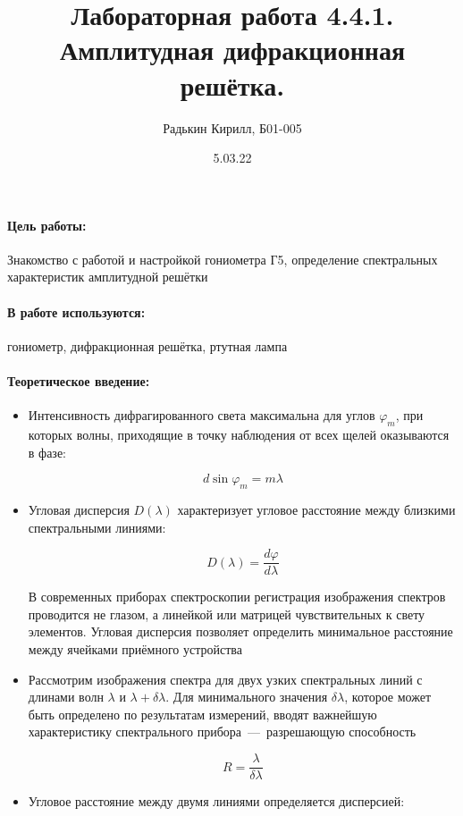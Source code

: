 \documentclass[a4paper, 12pt]{article}
\author{Радькин Кирилл, Б01-005}
\date{5.03.22}
\title{Лабораторная работа 4.4.1. Амплитудная дифракционная решётка.}
\renewcommand{\phi}{\varphi}
\newcommand{\parag}[1]{\paragraph*{#1:}}
\begin{document}
\maketitle

\parag {Цель работы} Знакомство с работой и настройкой гониометра Г5, определение спектральных характеристик амплитудной решётки

\parag {В работе используются} гониометр, дифракционная решётка, ртутная лампа

\parag {Теоретическое введение}

\begin{itemize}
    \item Интенсивность дифрагированного света максимальна для углов $\phi_m$, при которых волны, приходящие в точку наблюдения от всех щелей оказываются в фазе: 
    
    \begin{equation}
        \label{huinya1}
        d \sin \phi_m = m \lambda
    \end{equation}

    \item Угловая дисперсия $D(\lambda)$ характеризует угловое расстояние между близкими спектральными линиями:
    
    \begin{equation}
        \label{huinya2}
        D(\lambda) = \dfrac{d\phi}{d\lambda}
    \end{equation}

    В современных приборах спектроскопии регистрация изображения спектров проводится не глазом, а линейкой или матрицей чувствительных к свету элементов. Угловая дисперсия позволяет определить минимальное расстояние между ячейками приёмного устройства

    \item Рассмотрим изображения спектра для двух узких спектральных линий с длинами волн $\lambda$ и $\lambda + \delta \lambda$. Для минимального значения $\delta \lambda$, которое может быть определено по результатам измерений, вводят важнейшую
    характеристику спектрального прибора~---~разрешающую способность

    \begin{equation}
        \label{huinya3}
        R = \dfrac{\lambda}{\delta \lambda}
    \end{equation}

    \item Угловое расстояние между двумя линиями определяется дисперсией:
    

\end{itemize}
\end{document}
